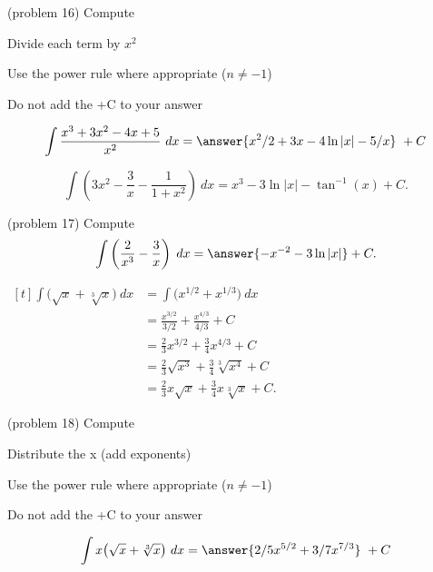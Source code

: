 \documentclass[handout]{ximera}
\begin{document}
\begin{problem}(problem 16)
Compute


\begin{hint}
Divide each term by $x^2$
\end{hint}
\begin{hint}
Use the power rule where appropriate ($n\neq -1$)
\end{hint}
\begin{hint}
\begin{center}
Do not add the +C to your answer
\end{center}
\end{hint}

\[
\int  \dfrac{x^3 + 3x^2 - 4x + 5}{x^2} \ dx =
\answer{x^2 /2 + 3x - 4\ln|x| -5/x} \ +  C
\]
\end{problem}



\begin{example}[example 17]
\[
\int \left(3x^2 - \dfrac{3}{x} - \dfrac{1}{1+x^2}\right) \ dx = x^3 - 3\ln|x| - \tan^{-1}(x) + C.
\]
\end{example}


\begin{problem}(problem 17)
Compute
\[
\int \left(\frac{2}{x^3} - \frac{3}{x} \right) \; dx = \answer{-x^{-2} -3\ln|x|} + C.
\]
\end{problem}

\begin{example}[example 18]
$\begin{aligned}[t]
\int \big(\sqrt x + \sqrt[3] x \big) \ dx &= \int \big(x^{1/2} + x^{1/3}\big) \ dx \\
&= \frac{x^{3/2}}{3/2} + \frac{x^{4/3}}{4/3} + C \\
&= \tfrac{2}{3} x^{3/2} + \tfrac{3}{4} x^{4/3} + C \\
&= \tfrac{2}{3} \sqrt {x^3} + \tfrac{3}{4}  \sqrt[3] {x^4} + C \\
&= \tfrac{2}{3} x\sqrt x + \tfrac{3}{4} x \sqrt[3] x + C.
\end{aligned}$
\end{example}


\begin{problem}(problem 18)
Compute

\begin{hint}
Distribute the x (add exponents)
\end{hint}
\begin{hint}
Use the power rule where appropriate ($n\neq -1$)
\end{hint}
\begin{hint}
\begin{center}
Do not add the +C to your answer
\end{center}
\end{hint}

\[
\int  x\big(\sqrt x + \sqrt[3] x \big) \ dx =
\answer{2/5 x^{5/2} + 3/7 x^{7/3}} \ +  C
\]
\end{problem}
\end{document}
